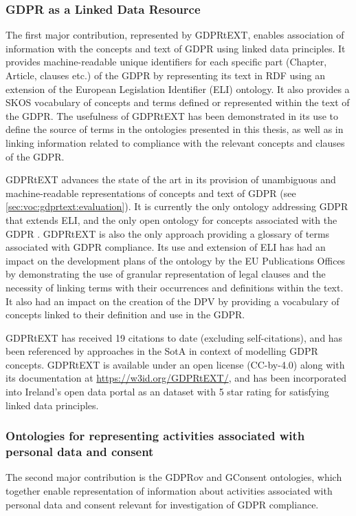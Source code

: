 \subsubsection*{GDPR as a Linked Data Resource}
The first major contribution, represented by GDPRtEXT, enables association of information with the concepts and text of GDPR using linked data principles. It provides machine-readable unique identifiers for each specific part (Chapter, Article, clauses etc.) of the GDPR by representing its text in RDF using an extension of the European Legislation Identifier (ELI) ontology. It also provides a SKOS vocabulary of concepts and terms defined or represented within the text of the GDPR. The usefulness of GDPRtEXT has been demonstrated in its use to define the source of terms in the ontologies presented in this thesis, as well as in linking information related to compliance with the relevant concepts and clauses of the GDPR.

GDPRtEXT advances the state of the art in its provision of unambiguous and machine-readable representations of concepts and text of GDPR (see \autoref{sec:voc:gdprtext:evaluation}).
It is currently the only ontology addressing GDPR that extends ELI, and the only open ontology for concepts associated with the GDPR \cite{leone_taking_2019}.
GDPRtEXT is also the only approach providing a glossary of terms associated with GDPR compliance.
Its use and extension of ELI has had an impact on the development plans of the ontology by the EU Publications Offices by demonstrating the use of granular representation of legal clauses and the necessity of linking terms with their occurrences and definitions within the text.
It also had an impact on the creation of the DPV by providing a vocabulary of concepts linked to their definition and use in the GDPR.

GDPRtEXT has received 19 citations to date (excluding self-citations), and has been referenced by approaches in the SotA in context of modelling GDPR concepts.
GDPRtEXT is available under an open license (CC-by-4.0) along with its documentation at 
\url{https://w3id.org/GDPRtEXT/}, and has been incorporated into Ireland's open data portal as an dataset with 5 star rating for satisfying linked data principles.

\subsubsection*{Ontologies for representing activities associated with personal data and consent}
The second major contribution is the GDPRov and GConsent ontologies, which together enable representation of information about activities associated with personal data and consent relevant for investigation of GDPR compliance.

